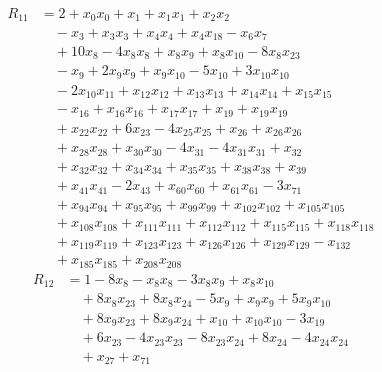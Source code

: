 \begin{align*}
R_{11}&={}2 +x_{0}x_{0} +x_{1} +x_{1}x_{1} +x_{2}x_{2}\\
&\quad{}-x_{3} +x_{3}x_{3} +x_{4}x_{4} +x_{4}x_{18} -x_{6}x_{7}\\
&\quad{}+10x_{8} -4x_{8}x_{8} +x_{8}x_{9} +x_{8}x_{10} -8x_{8}x_{23}\\
&\quad{}-x_{9} +2x_{9}x_{9} +x_{9}x_{10} -5x_{10} +3x_{10}x_{10}\\
&\quad{}-2x_{10}x_{11} +x_{12}x_{12} +x_{13}x_{13} +x_{14}x_{14} +x_{15}x_{15}\\
&\quad{}-x_{16} +x_{16}x_{16} +x_{17}x_{17} +x_{19} +x_{19}x_{19}\\
&\quad{}+x_{22}x_{22} +6x_{23} -4x_{25}x_{25} +x_{26} +x_{26}x_{26}\\
&\quad{}+x_{28}x_{28} +x_{30}x_{30} -4x_{31} -4x_{31}x_{31} +x_{32}\\
&\quad{}+x_{32}x_{32} +x_{34}x_{34} +x_{35}x_{35} +x_{38}x_{38} +x_{39}\\
&\quad{}+x_{41}x_{41} -2x_{43} +x_{60}x_{60} +x_{61}x_{61} -3x_{71}\\
&\quad{}+x_{94}x_{94} +x_{95}x_{95} +x_{99}x_{99} +x_{102}x_{102} +x_{105}x_{105}\\
&\quad{}+x_{108}x_{108} +x_{111}x_{111} +x_{112}x_{112} +x_{115}x_{115} +x_{118}x_{118}\\
&\quad{}+x_{119}x_{119} +x_{123}x_{123} +x_{126}x_{126} +x_{129}x_{129} -x_{132}\\
&\quad{}+x_{185}x_{185} +x_{208}x_{208}
\end{align*}
\begin{align*}
R_{12}&={}1 -8x_{8} -x_{8}x_{8} -3x_{8}x_{9} +x_{8}x_{10}\\
&\quad{}+8x_{8}x_{23} +8x_{8}x_{24} -5x_{9} +x_{9}x_{9} +5x_{9}x_{10}\\
&\quad{}+8x_{9}x_{23} +8x_{9}x_{24} +x_{10} +x_{10}x_{10} -3x_{19}\\
&\quad{}+6x_{23} -4x_{23}x_{23} -8x_{23}x_{24} +8x_{24} -4x_{24}x_{24}\\
&\quad{}+x_{27} +x_{71}
\end{align*}
